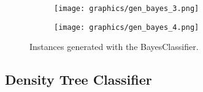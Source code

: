 \documentclass[draft]{article}
\begin{document}
\begin{figure}[h]
	\centering
	\begin{subfigure}[b]{0.4\textwidth}
		\texttt{[image: graphics/gen\_bayes\_3.png]}
	\end{subfigure}
	\begin{subfigure}[b]{0.4\textwidth}
		\texttt{[image: graphics/gen\_bayes\_4.png]}
	\end{subfigure}
	\caption{Instances generated with the BayesClassifier.}
	\label{fig1}
\end{figure}

\subsection{Density Tree Classifier} \label{dt}
\end{document}
